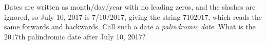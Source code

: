 Dates are written as month/day/year with no leading zeros, and the slashes are ignored, so July 10, 2017 is 7/10/2017, giving the string $7102017$, which reads the same forwards and backwards. Call such a date a \emph{palindromic date}. What is the $2017$th palindromic date after July 10, 2017?
